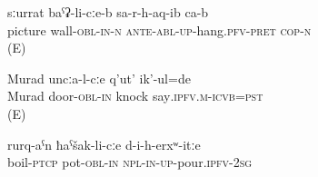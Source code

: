 \begin{exe} 
	\ex	\label{ex:pic on wall_2}
	\gll	sːurrat baˁʡ-li-cːe-b sa-r-h-aq-ib ca-b\\
picture	wall-\textsc{obl-in-n}	\textsc{ante-abl-up}-hang.\textsc{pfv-pret}	\textsc{cop-n} \\
	\glt	{} (E)
	
		\ex	\label{Murad knocked at the door.}
	\gll	Murad uncːa-l-cːe q'ut' ik'-ul=de\\
 Murad door-\textsc{obl-in} knock say\textsc{.ipfv.m-icvb=pst}\\
	\glt	{} (E)
	
			\ex	\label{You pour (them) into a pot with boiling (water).}
	\gll	rurq-aˁn ħaˁšak-li-cːe d-i-h-erxʷ-itːe \\
boil-\textsc{ptcp}	pot-\textsc{obl-in}	\textsc{npl-in-up}-pour.\textsc{ipfv-2sg} \\
	\glt	{} 
	
\end{exe}

